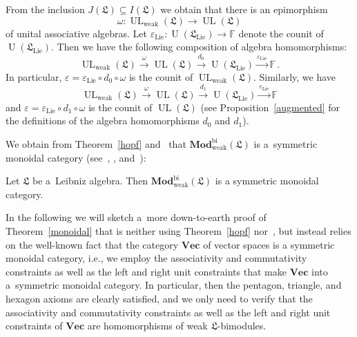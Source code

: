 \documentclass{jonasart}
\DeclareMathOperator{\bi}{bi}
\DeclareMathOperator{\lie}{Lie}
\DeclareMathOperator{\U}{U}
\DeclareMathOperator{\UL}{UL}
\DeclareMathOperator{\weak}{weak}
\newcommand{\fbb}{\mathbb{F}}
\newcommand{\lf}{\mathfrak{L}}
\newcommand{\Mod}{\mathbf{Mod}}
\newcommand{\vect}{\mathbf{Vec}}
\begin{document}
	From the inclusion $J(\lf)\subseteq I(\lf)$ we obtain that there is an epimorphism
	\[
		\omega:\UL_{\weak}(\lf)\to\UL(\lf)
	\]
	of unital associative algebras. Let $\varepsilon_{\lie}:\U(\lf_{\lie})\to
	\fbb$ denote the counit of $\U(\lf_{\lie})$. Then we have the following composition of algebra homomorphisms:
	\[
		\UL_{\weak}(\lf) \stackrel{\omega}\to \UL(\lf) \stackrel{d_0}\to \U(\lf_{\lie}) \stackrel{\varepsilon_{\lie}}\to \fbb\,.
	\]
	In particular, $\varepsilon=\varepsilon_{\lie}\circ d_0\circ\omega$
	is the counit of $\UL_{\weak}(\lf)$. Similarly, we have
	\[
        \UL_{\weak}(\lf) \stackrel{\omega}\to \UL(\lf) \stackrel{d_1}\to \U(\lf_{\lie}) \stackrel{\varepsilon_{\lie}}\to \fbb
	\]
	and $\varepsilon=\varepsilon_{\lie}\circ d_1\circ\omega$ is the counit of $\UL(\lf)$ (see Proposition~\ref{augmented} for the definitions of the algebra homomorphisms $d_0$ and $d_1$).

	We obtain from Theorem~\ref{hopf} and~\cite[Proposition III.5.1]{K}
	that $\Mod_{\weak}^{\bi}(\lf)$ is a~symmetric monoidal category (see~\cite[Section~VII.1, pp.~162/163, Section~XI.1, pp.~252/253]{McL}, \cite[Definition XI.2.1]{K}, and~\cite[Definitions 8.1.1, 8.1.2, and
	8.1.12]{EGNO}):
	\begin{theorem}\label{monoidal}
		Let $\lf$ be a~Leibniz algebra. Then $\Mod_{\weak}^{\bi}(\lf)$ is a symmetric monoidal category.
	\end{theorem}
	In the following we will sketch a~more down-to-earth proof of
	Theorem~\ref{monoidal} that is neither using Theorem~\ref{hopf}
	nor~\cite[Proposition III.5.1]{K}, but instead relies on the well-known fact that the category $\vect$ of vector spaces is a symmetric monoidal category, i.e., we employ the associativity and commutativity constraints as well as the left and right unit constraints that make $\vect$ into a~symmetric monoidal category. In particular, then the pentagon, triangle, and hexagon axioms are clearly satisfied, and we only need to verify that the associativity and commutativity constraints as well as the left and right unit constraints of $\vect$ are homomorphisms of weak $\lf$-bimodules.
\end{document}
